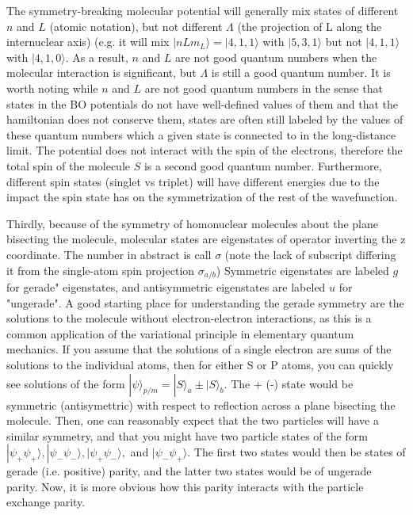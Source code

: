 \documentclass[prl, longbibliography]{revtex4-2}
\begin{document}
The symmetry-breaking molecular potential will generally mix states of different $n$ and $L$ (atomic notation), but not different $\Lambda$ (the projection of L along the internuclear axis) (e.g. it will mix $|nLm_L\rangle=|4,1,1\rangle$ with $|5,3,1\rangle$ but not $|4,1,1\rangle$ with $|4,1,0\rangle$. 
As a result, $n$ and $L$ are not good quantum numbers when the molecular interaction is significant, but $\Lambda$ is still a good quantum number. 
It is worth noting while $n$ and $L$ are not good quantum numbers in the sense that states in the BO potentials do not have well-defined values of them and that the hamiltonian does not conserve them, states are often still labeled by the values of these quantum numbers which a given state is connected to in the long-distance limit.
The potential does not interact with the spin of the electrons, therefore the total spin of the molecule $S$ is a second good quantum number. Furthermore, different spin states (singlet vs triplet) will have different energies due to the impact the spin state has on the symmetrization of the rest of the wavefunction.

Thirdly, because of the symmetry of homonuclear molecules about the plane bisecting the molecule, molecular states are eigenstates of operator inverting the z coordinate. The number in abstract is call $\sigma$ (note the lack of subscript differing it from the single-atom spin projection $\sigma_{a/b}$) Symmetric eigenstates are labeled $g$ for gerade" eigenstates, and antisymmetric eigenstates are labeled $u$ for "ungerade". A good starting place for understanding the gerade symmetry are the solutions to the molecule without electron-electron interactions, as this is a common application of the variational principle in elementary quantum mechanics. If you assume that the solutions of a single electron are sums of the solutions to the individual atoms, then for either S or P atoms, you can quickly see solutions of the form $|\psi\rangle_{p/m}=|S\rangle _a \pm |S\rangle _b$. The + (-) state would be symmetric (antisymettric) with respect to reflection across a plane bisecting the molecule. Then, one can reasonably expect that the two particles will have a similar symmetry, and that you might have two particle states of the form $|\psi_+\psi_+\rangle,|\psi_-\psi_-\rangle, |\psi_+\psi_-\rangle, $ and $|\psi_-\psi_+\rangle$. The first two states would then be states of gerade (i.e. positive) parity, and the latter two states would be of ungerade parity. Now, it is more obvious how this parity interacts with the particle exchange parity. 
\end{document}
